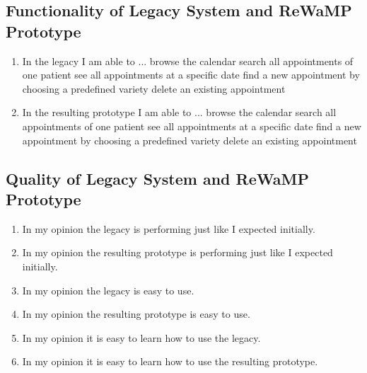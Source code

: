 \begin{appendix}
\subsection*{Functionality of Legacy System and ReWaMP Prototype}
\begin{enumerate}
\item In the legacy I am able to ...
\subitem browse the calendar
\subitem search all appointments of one patient
\subitem see all appointments at a specific date
\subitem find a new appointment by choosing a predefined variety
\subitem delete an existing appointment
\item In the resulting prototype I am able to ...
\subitem browse the calendar
\subitem search all appointments of one patient
\subitem see all appointments at a specific date
\subitem find a new appointment by choosing a predefined variety
\subitem delete an existing appointment
\end{enumerate}

\subsection*{Quality of Legacy System and ReWaMP Prototype}\vspace{-2pt}
\begin{enumerate}
\item In my opinion the legacy is performing just like I expected initially.
\item In my opinion the resulting prototype is performing just like I expected initially.
\item In my opinion the legacy is easy to use.
\item In my opinion the resulting prototype is easy to use.
\item In my opinion it is easy to learn how to use the legacy.
\item In my opinion it is easy to learn how to use the resulting prototype.
\end{enumerate}

\vspace{-20pt}

\end{appendix}
